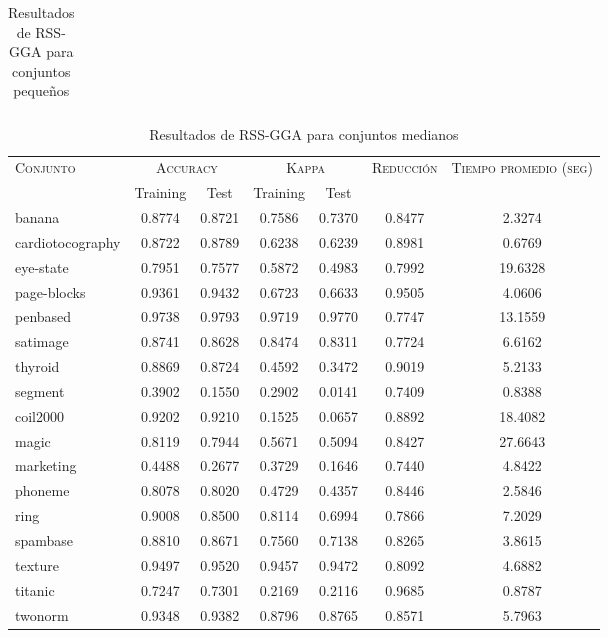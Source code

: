 \begin{table}[]
\begin{tabular}{l c c c c c c}
\hline
\end{tabular}
\caption{Resultados de RSS-GGA para conjuntos pequeños }
\label{res-peq-rss-gga}
\end{table}



\begin{table}[]
\centering
\begin{tabular}{l c c c c c c}
\hline
\multirow{2}{*}{\textsc{Conjunto}}
	& \multicolumn{2}{c}{\textsc{Accuracy}}
	& \multicolumn{2}{c}{\textsc{Kappa}}
	& \textsc{Reducción}
	& \textsc{Tiempo promedio (seg)} \\
	& Training & Test
	& Training & Test \\ 
\hline
\hline

banana & 0.8774 & 0.8721 & 0.7586 & 0.7370 & 0.8477 & 2.3274 \\
cardiotocography & 0.8722 & 0.8789 & 0.6238 & 0.6239 & 0.8981 & 0.6769 \\
eye-state & 0.7951 & 0.7577 & 0.5872 & 0.4983 & 0.7992 & 19.6328 \\
page-blocks & 0.9361 & 0.9432 & 0.6723 & 0.6633 & 0.9505 & 4.0606 \\
penbased & 0.9738 & 0.9793 & 0.9719 & 0.9770 & 0.7747 & 13.1559 \\
satimage & 0.8741 & 0.8628 & 0.8474 & 0.8311 & 0.7724 & 6.6162 \\
thyroid & 0.8869 & 0.8724 & 0.4592 & 0.3472 & 0.9019 & 5.2133 \\
segment & 0.3902 & 0.1550 & 0.2902 & 0.0141 & 0.7409 & 0.8388 \\
coil2000 & 0.9202 & 0.9210 & 0.1525 & 0.0657 & 0.8892 & 18.4082 \\
magic & 0.8119 & 0.7944 & 0.5671 & 0.5094 & 0.8427 & 27.6643 \\
marketing & 0.4488 & 0.2677 & 0.3729 & 0.1646 & 0.7440 & 4.8422 \\
phoneme & 0.8078 & 0.8020 & 0.4729 & 0.4357 & 0.8446 & 2.5846 \\
ring & 0.9008 & 0.8500 & 0.8114 & 0.6994 & 0.7866 & 7.2029 \\
spambase & 0.8810 & 0.8671 & 0.7560 & 0.7138 & 0.8265 & 3.8615 \\
texture & 0.9497 & 0.9520 & 0.9457 & 0.9472 & 0.8092 & 4.6882 \\
titanic & 0.7247 & 0.7301 & 0.2169 & 0.2116 & 0.9685 & 0.8787 \\
twonorm & 0.9348 & 0.9382 & 0.8796 & 0.8765 & 0.8571 & 5.7963 \\

\hline
\end{tabular}
\caption{Resultados de RSS-GGA para conjuntos medianos }
\label{res-med-rss-gga}
\end{table}



